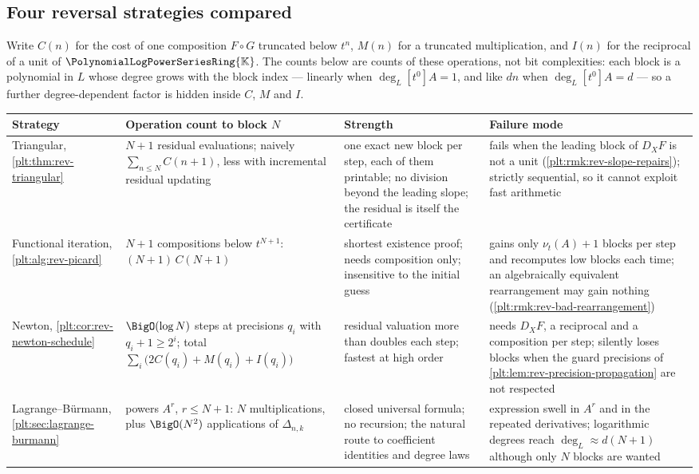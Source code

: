 \documentclass[11pt,oneside]{article}
\theoremstyle{plain}
\theoremstyle{definition}
\theoremstyle{remark}
\newcommand{\K}{\mathbb{K}}
\newcommand{\PLpow}{\PolynomialLogPowerSeriesRing{\K}}   %
\newcommand{\ordt}{\nu_{t}}                              %
\newcommand{\DX}{D_{X}}                                  %
\newcommand{\shiftop}[2]{\Delta_{#1,#2}}                 %
\newcommand{\compose}{\mathbin{\circ}}
\begin{document}
\subsection{Four reversal strategies compared}
\label{plt:sec:rev-comparison}

Write \(C(n)\) for the cost of one composition \(F\compose G\) truncated below
\(t^{n}\), \(M(n)\) for a truncated multiplication, and \(I(n)\) for the
reciprocal of a unit of \(\PLpow\).  The counts below are counts of these
operations, not bit complexities: each block is a polynomial in \(L\) whose
degree grows with the block index --- linearly when \(\deg_L[t^0]A=1\), and
like \(dn\) when \(\deg_L[t^0]A=d\) --- so a further degree-dependent factor is
hidden inside \(C\), \(M\) and \(I\).

\begin{center}
\begin{tabular}{@{}p{}p{}p{}p{}@{}}
\hline
Strategy & Operation count to block \(N\) & Strength & Failure mode\\
\hline
Triangular,
 \cref{plt:thm:rev-triangular}
& \(N+1\) residual evaluations; naively \(\sum_{n\le N}C(n{+}1)\), less with
 incremental residual updating
& one exact new block per step, each of them printable; no division beyond the
 leading slope; the residual is itself the certificate
& fails when the leading block of \(\DX F\) is not a unit
 (\cref{plt:rmk:rev-slope-repairs}); strictly sequential, so it cannot exploit
 fast arithmetic\\
\hline
Functional iteration,
 \cref{plt:alg:rev-picard}
& \(N+1\) compositions below \(t^{N+1}\): \((N{+}1)\,C(N{+}1)\)
& shortest existence proof; needs composition only; insensitive to the initial
 guess
& gains only \(\ordt(A)+1\) blocks per step and recomputes low blocks each
 time; an algebraically equivalent rearrangement may gain nothing
 (\cref{plt:rmk:rev-bad-rearrangement})\\
\hline
Newton,
 \cref{plt:cor:rev-newton-schedule}
& \(\BigO(\log N)\) steps at precisions \(q_i\) with \(q_i+1\ge2^i\); total
 \(\sum_i\bigl(2C(q_i)+M(q_i)+I(q_i)\bigr)\)
& residual valuation more than doubles each step; fastest at high order
& needs \(\DX F\), a reciprocal and a composition per step; silently loses
 blocks when the guard precisions of
 \cref{plt:lem:rev-precision-propagation} are not respected\\
\hline
Lagrange--B\"urmann,
 \cref{plt:sec:lagrange-burmann}
& powers \(A^r\), \(r\le N+1\): \(N\) multiplications, plus \(\BigO(N^2)\)
 applications of \(\shiftop{n}{k}\)
& closed universal formula; no recursion; the natural route to coefficient
 identities and degree laws
& expression swell in \(A^r\) and in the repeated derivatives; logarithmic
 degrees reach \(\deg_L\approx d(N{+}1)\) although only \(N\) blocks are
 wanted\\
\hline
\end{tabular}
\end{center}
\end{document}
